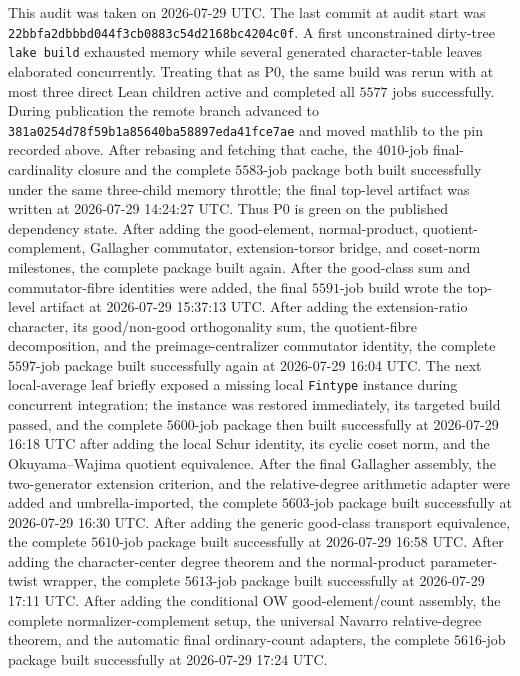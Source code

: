 \documentclass[11pt]{article}
\begin{document}
This audit was taken on 2026-07-29 UTC.  The last commit at audit start was
\texttt{22bbfa2dbbbd044f3cb0883c54d2168bc4204c0f}.  A first unconstrained
dirty-tree \texttt{lake build} exhausted memory while several generated
character-table leaves elaborated concurrently.  Treating that as P0, the
same build was rerun with at most three direct Lean children active and
completed all \(5577\) jobs successfully.  During publication the remote
branch advanced to \texttt{381a0254d78f59b1a85640ba58897eda41fce7ae}
and moved mathlib to the pin recorded above.  After rebasing and fetching
that cache, the \(4010\)-job final-cardinality closure and the complete
\(5583\)-job package both built successfully under the same three-child
memory throttle; the final top-level artifact was written at
2026-07-29 14:24:27 UTC.  Thus P0 is green on the published dependency
state.  After adding the good-element, normal-product, quotient-complement,
Gallagher commutator, extension-torsor bridge, and coset-norm milestones,
the complete package built again.  After the good-class sum and
commutator-fibre identities were added, the final \(5591\)-job build wrote
the top-level artifact at 2026-07-29 15:37:13 UTC.  After adding the
extension-ratio character, its good/non-good orthogonality sum, the
quotient-fibre decomposition, and the preimage-centralizer commutator
identity, the complete \(5597\)-job package built successfully again at
2026-07-29 16:04 UTC.  The next local-average leaf briefly exposed a
missing local \texttt{Fintype} instance during concurrent integration;
the instance was restored immediately, its targeted build passed, and the
complete \(5600\)-job package then built successfully at
2026-07-29 16:18 UTC after adding the local Schur identity, its cyclic
coset norm, and the Okuyama--Wajima quotient equivalence.  After the final
Gallagher assembly, the two-generator extension criterion, and the
relative-degree arithmetic adapter were added and umbrella-imported, the
complete \(5603\)-job package built successfully at 2026-07-29 16:30 UTC.
After adding the generic good-class transport equivalence, the complete
\(5610\)-job package built successfully at 2026-07-29 16:58 UTC.
After adding the character-center degree theorem and the normal-product
parameter-twist wrapper, the complete \(5613\)-job package built
successfully at 2026-07-29 17:11 UTC.
After adding the conditional OW good-element/count assembly, the complete
normalizer-complement setup, the universal Navarro relative-degree theorem,
and the automatic final ordinary-count adapters, the complete
\(5616\)-job package built successfully at 2026-07-29 17:24 UTC.
\end{document}
